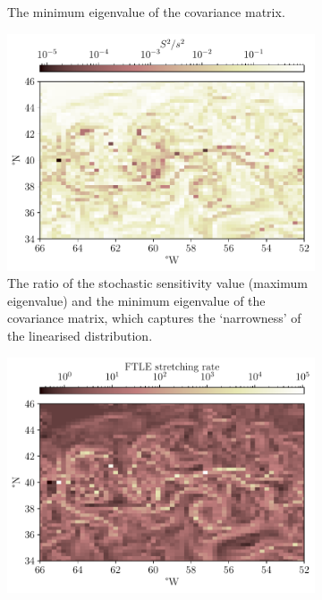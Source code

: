 \begin{figure}
\begin{center}
\begin{subfigure}[t]{0.49\textwidth}
			\caption{The minimum eigenvalue of the covariance matrix.}
		\end{subfigure}
		\begin{subfigure}[t]{0.49\textwidth}
			\includegraphics[width=\textwidth]{chp06_applications/figures/gulf_stream/ratio_field_grid}
			\caption{The ratio of the stochastic sensitivity value (maximum eigenvalue) and the minimum eigenvalue of the covariance matrix, which captures the `narrowness' of the linearised distribution.}
		\end{subfigure}
		\begin{subfigure}[t]{0.49\textwidth}
			\includegraphics[width=\textwidth]{chp06_applications/figures/gulf_stream/ftle_field_grid}

\end{subfigure}
\end{center}
\end{figure}
